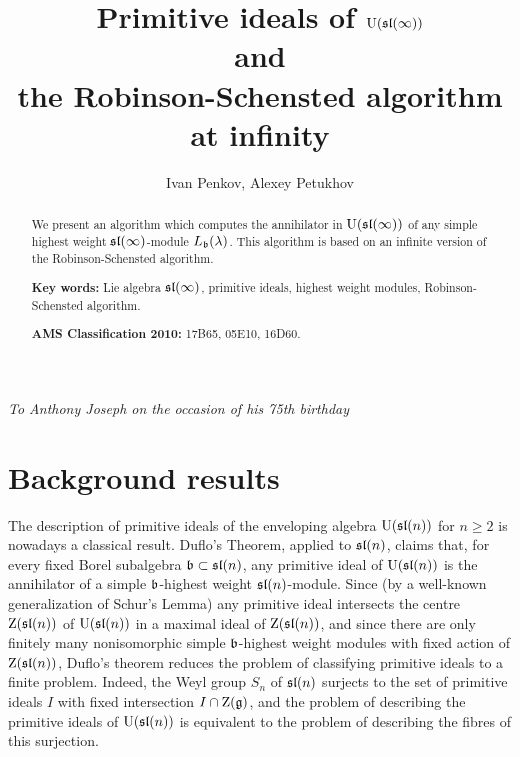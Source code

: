 \documentclass[10pt]{amsart}\oddsidemargin -1mm \evensidemargin -1mm \topmargin -15mm\headheight5mm \headsep 3.5mm \textheight 245mm\textwidth 170mm
\theoremstyle{definition}\newtheorem{theorem}{Theorem}[section]\newtheorem{lemma}[theorem]{Lemma}\newtheorem{remark}[theorem]{Remark}\newtheorem{proposition}[theorem]{Proposition}\newtheorem{corollary}[theorem]{Corollary}\newtheorem{definition}[theorem]{Definition}\newtheorem{Ex}[theorem]{Example}\newtheorem{obs}[theorem]{Observation}\newtheorem{nota}[theorem]{Notation}
\begin{document}
\title[Primitive ideals of ${\rm U}(\frak{sl}(\infty))$ and the Robinson-Schensted algorithm at infinity]{Primitive ideals of ${\rm U}(\frak{sl}(\infty))$\\ and\\ the Robinson-Schensted algorithm at infinity}
\author{Ivan Penkov, Alexey Petukhov}
\address{Ivan Penkov: Jacobs University Bremen, Campus Ring 1, D-28759, Bremen, Germany}
\address{Alexey Petukhov: Institute for Information Transmission Problems, Bolshoy Karetniy 19-1, Moscow 127994, Russia}
\maketitle
\begin{center}
  {\it To Anthony Joseph on the occasion of his 75th birthday}
\end{center}
\begin{abstract} We present an algorithm which computes the annihilator in ${\rm U}(\frak{sl}(\infty))$ of any simple highest weight $\frak{sl}(\infty)$-module $L_\frak b(\lambda)$. 
This algorithm is based on an infinite version of the Robinson-Schensted algorithm.

{\bf Key words:} Lie algebra $\frak{sl}(\infty)$, primitive ideals, highest weight modules, Robinson-Schensted algorithm.

{\bf AMS Classification 2010:} 17B65, 05E10, 16D60.
\end{abstract}


\section{Background results}\label{Sback}

The description of primitive ideals of the enveloping algebra ${\rm U}(\frak{sl}(n))$ for $n\ge2$ is nowadays a classical result. 
Duflo's Theorem, applied to $\frak{sl}(n)$, claims that, for every fixed Borel subalgebra $\frak b\subset\frak{sl}(n)$, any primitive ideal of ${\rm U}(\frak{sl}(n))$ is the annihilator of a simple $\frak b$-highest weight $\frak{sl}(n)$-module. 
Since (by a well-known generalization of Schur's Lemma) any primitive ideal intersects the centre ${\rm Z}(\frak{sl}(n))$ of ${\rm U}(\frak{sl}(n))$ in a maximal ideal of ${\rm Z}(\frak{sl}(n))$, and since there are only finitely many nonisomorphic simple $\frak b$-highest weight modules with fixed action of ${\rm Z}(\frak{sl}(n))$, Duflo's theorem reduces the problem of classifying primitive ideals to a finite problem. 
Indeed, the Weyl group $S_n$ of $\frak{sl}(n)$ surjects to the set of primitive ideals $I$ with fixed intersection $I\cap{\rm Z}(\frak g)$, and the problem of describing the primitive ideals of ${\rm U}(\frak{sl}(n))$  is equivalent to the problem of describing the fibres of this surjection.
\end{document}
